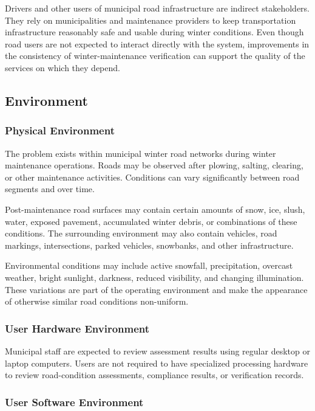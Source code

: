 \documentclass{article}
\begin{document}
Drivers and other users of municipal road infrastructure are indirect
stakeholders. They rely on municipalities and maintenance providers to keep
transportation infrastructure reasonably safe and usable during winter
conditions. Even though road users are not expected to interact directly with the
system, improvements in the consistency of winter-maintenance verification can
support the quality of the services on which they depend.

\subsection{Environment}

\subsubsection{Physical Environment}

The problem exists within municipal winter road networks during winter
maintenance operations. Roads may be observed after plowing, salting, clearing,
or other maintenance activities. Conditions can vary significantly between road
segments and over time.

Post-maintenance road surfaces may contain certain amounts of snow, ice, slush,
water, exposed pavement, accumulated winter debris, or combinations of these
conditions. The surrounding environment may also contain vehicles, road
markings, intersections, parked vehicles, snowbanks, and other infrastructure.

Environmental conditions may include active snowfall, precipitation, overcast
weather, bright sunlight, darkness, reduced visibility, and changing
illumination. These variations are part of the operating environment and make
the appearance of otherwise similar road conditions non-uniform.

\subsubsection{User Hardware Environment}

Municipal staff are expected to review assessment results using regular
desktop or laptop computers. Users are not required to have specialized processing
hardware to review road-condition assessments, compliance results, or
verification records.

\subsubsection{User Software Environment}
\end{document}
